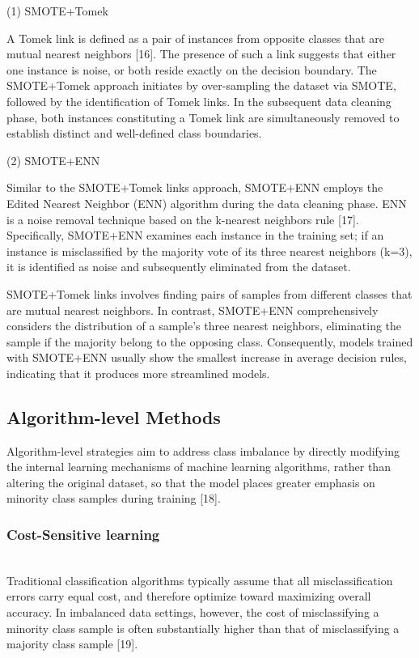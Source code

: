 \documentclass[sigconf]{acmart}
\begin{document}
(1) SMOTE+Tomek 

A Tomek link is defined as a pair of instances from opposite classes that are mutual nearest neighbors [16]. The presence of such a link suggests that either one instance is noise, or both reside exactly on the decision boundary. The SMOTE+Tomek approach initiates by over-sampling the dataset via SMOTE, followed by the identification of Tomek links. In the subsequent data cleaning phase, both instances constituting a Tomek link are simultaneously removed to establish distinct and well-defined class boundaries. 

(2) SMOTE+ENN 

Similar to the SMOTE+Tomek links approach, SMOTE+ENN employs the Edited Nearest Neighbor (ENN) algorithm during the data cleaning phase. ENN is a noise removal technique based on the k-nearest neighbors rule [17]. Specifically, SMOTE+ENN examines each instance in the training set; if an instance is misclassified by the majority vote of its three nearest neighbors (k=3), it is identified as noise and subsequently eliminated from the dataset. 

SMOTE+Tomek links involves finding pairs of samples from different classes that are mutual nearest neighbors. In contrast, SMOTE+ENN comprehensively considers the distribution of a sample's three nearest neighbors, eliminating the sample if the majority belong to the opposing class. Consequently, models trained with SMOTE+ENN usually show the smallest increase in average decision rules, indicating that it produces more streamlined models. 

\subsection{Algorithm-level Methods}
Algorithm-level strategies aim to address class imbalance by directly modifying the internal learning mechanisms of machine learning algorithms, rather than altering the original dataset, so that the model places greater emphasis on minority class samples during training [18]. 

\subsubsection{Cost-Sensitive learning}~\\

Traditional classification algorithms typically assume that all misclassification errors carry equal cost, and therefore optimize toward maximizing overall accuracy. In imbalanced data settings, however, the cost of misclassifying a minority class sample is often substantially higher than that of misclassifying a majority class sample [19]. 
\end{document}
